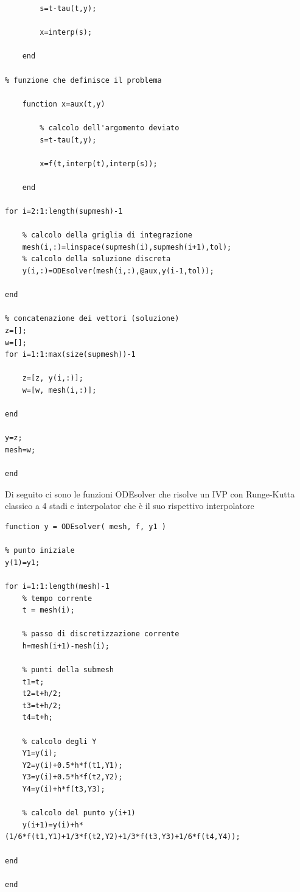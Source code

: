 \begin{lstlisting}[breaklines,caption={Implementazione del metodo dei passi per la risoluzione delle DDE}]
        % calcolo dell'argomento deviato
        s=t-tau(t,y);
        
        x=interp(s);
        
    end

% funzione che definisce il problema

    function x=aux(t,y)
        
        % calcolo dell'argomento deviato
        s=t-tau(t,y);
        
        x=f(t,interp(t),interp(s));
        
    end

for i=2:1:length(supmesh)-1
    
    % calcolo della griglia di integrazione
    mesh(i,:)=linspace(supmesh(i),supmesh(i+1),tol);
    % calcolo della soluzione discreta
    y(i,:)=ODEsolver(mesh(i,:),@aux,y(i-1,tol));
    
end

% concatenazione dei vettori (soluzione)
z=[];
w=[];
for i=1:1:max(size(supmesh))-1
    
    z=[z, y(i,:)];
    w=[w, mesh(i,:)];
    
end

y=z;
mesh=w;

end
\end{lstlisting}
\newpage
Di seguito ci sono le funzioni ODEsolver che risolve un IVP con Runge-Kutta classico a 4 stadi e interpolator che è il suo rispettivo 
interpolatore

\begin{lstlisting}[breaklines,caption={Risolutore di IVP}]
function y = ODEsolver( mesh, f, y1 )

% punto iniziale
y(1)=y1;

for i=1:1:length(mesh)-1
    % tempo corrente
    t = mesh(i);
    
    % passo di discretizzazione corrente
    h=mesh(i+1)-mesh(i);
    
    % punti della submesh
    t1=t;
    t2=t+h/2;
    t3=t+h/2;
    t4=t+h;
    
    % calcolo degli Y
    Y1=y(i);
    Y2=y(i)+0.5*h*f(t1,Y1);
    Y3=y(i)+0.5*h*f(t2,Y2);
    Y4=y(i)+h*f(t3,Y3);
    
    % calcolo del punto y(i+1)
    y(i+1)=y(i)+h*(1/6*f(t1,Y1)+1/3*f(t2,Y2)+1/3*f(t3,Y3)+1/6*f(t4,Y4));
    
end

end
\end{lstlisting}

\newpage

